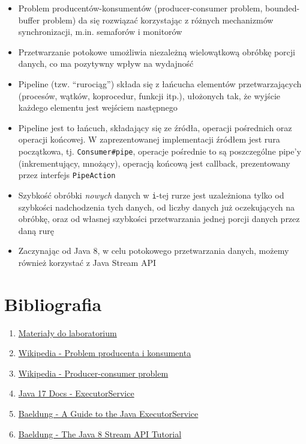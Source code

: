 \documentclass[11pt]{article}
\providecommand{\tightlist}{%
      \setlength{\itemsep}{0pt}\setlength{\parskip}{0pt}}
\begin{document}
\begin{itemize}
\tightlist
\item
  Problem producentów-konsumentów (producer-consumer problem,
  bounded-buffer problem) da się rozwiązać korzystając z różnych
  mechanizmów synchronizacji, m.in. semaforów i monitorów
\item
  Przetwarzanie potokowe umożliwia niezależną wielowątkową obróbkę
  porcji danych, co ma pozytywny wpływ na wydajność
\item
  Pipeline (tzw. ``rurociąg'') składa się z łańcucha elementów
  przetwarzających (procesów, wątków, koprocedur, funkcji itp.),
  ułożonych tak, że wyjście każdego elementu jest wejściem następnego
\item
  Pipeline jest to łańcuch, składający się ze źródła, operacji
  pośrednich oraz operacji końcowej. W zaprezentowanej implementacji
  źródłem jest rura początkowa, tj. \texttt{Consumer\#pipe}, operacje
  pośrednie to są poszczególne pipe'y (inkrementujący, mnożący),
  operacją końcową jest callback, prezentowany przez interfejs
  \texttt{PipeAction}
\item
  Szybkość obróbki \emph{nowych} danych w \texttt{i}-tej rurze jest
  uzależniona tylko od szybkości nadchodzenia tych danych, od liczby
  danych już oczekujących na obróbkę, oraz od własnej szybkości
  przetwarzania jednej porcji danych przez daną rurę
\item
  Zaczynając od Java 8, w celu potokowego przetwarzania danych, możemy
  również korzystać z Java Stream API
\end{itemize}

    \hypertarget{bibliografia}{%
\section{Bibliografia}\label{bibliografia}}

\begin{enumerate}
\def\labelenumi{\arabic{enumi}.}
\tightlist
\item
  \href{https://home.agh.edu.pl/~funika/tw/lab3/}{Materiały do
  laboratorium}
\item
  \href{https://pl.wikipedia.org/wiki/Problem_producenta_i_konsumenta}{Wikipedia
  - Problem producenta i konsumenta}
\item
  \href{https://en.wikipedia.org/wiki/Producer\%E2\%80\%93consumer_problem}{Wikipedia
  - Producer-consumer problem}
\item
  \href{https://docs.oracle.com/en/java/javase/17/docs/api/java.base/java/util/concurrent/ExecutorService.html}{Java
  17 Docs - ExecutorService}
\item
  \href{https://www.baeldung.com/java-executor-service-tutorial}{Baeldung
  - A Guide to the Java ExecutorService}
\item
  \href{https://www.baeldung.com/java-8-streams}{Baeldung - The Java 8
  Stream API Tutorial}
\end{enumerate}


    
    
    
\end{document}
